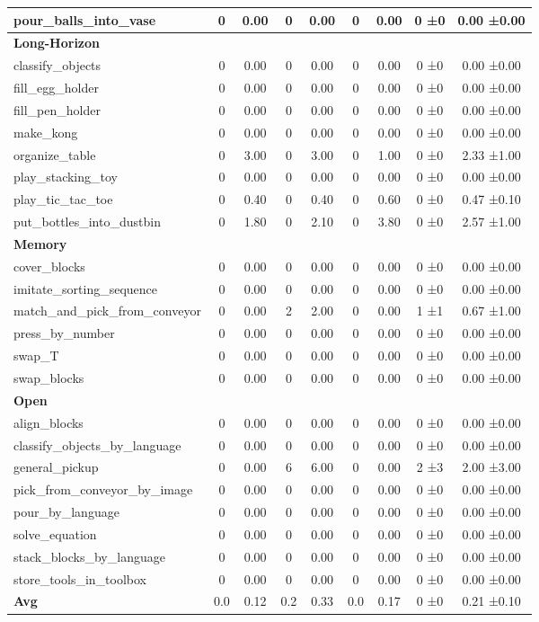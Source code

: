 \begin{table}[H]
{\begin{tabular}{l|c|c|c|c|c|c|c|c}
pour\_balls\_into\_vase & 0 & 0.00 & 0 & 0.00 & 0 & 0.00 & 0 ±0 & 0.00 ±0.00 \\
\hline
\multicolumn{9}{l}{\textbf{Long-Horizon}} \\
classify\_objects & 0 & 0.00 & 0 & 0.00 & 0 & 0.00 & 0 ±0 & 0.00 ±0.00 \\
fill\_egg\_holder & 0 & 0.00 & 0 & 0.00 & 0 & 0.00 & 0 ±0 & 0.00 ±0.00 \\
fill\_pen\_holder & 0 & 0.00 & 0 & 0.00 & 0 & 0.00 & 0 ±0 & 0.00 ±0.00 \\
make\_kong & 0 & 0.00 & 0 & 0.00 & 0 & 0.00 & 0 ±0 & 0.00 ±0.00 \\
organize\_table & 0 & 3.00 & 0 & 3.00 & 0 & 1.00 & 0 ±0 & 2.33 ±1.00 \\
play\_stacking\_toy & 0 & 0.00 & 0 & 0.00 & 0 & 0.00 & 0 ±0 & 0.00 ±0.00 \\
play\_tic\_tac\_toe & 0 & 0.40 & 0 & 0.40 & 0 & 0.60 & 0 ±0 & 0.47 ±0.10 \\
put\_bottles\_into\_dustbin & 0 & 1.80 & 0 & 2.10 & 0 & 3.80 & 0 ±0 & 2.57 ±1.00 \\
\hline
\multicolumn{9}{l}{\textbf{Memory}} \\
cover\_blocks & 0 & 0.00 & 0 & 0.00 & 0 & 0.00 & 0 ±0 & 0.00 ±0.00 \\
imitate\_sorting\_sequence & 0 & 0.00 & 0 & 0.00 & 0 & 0.00 & 0 ±0 & 0.00 ±0.00 \\
match\_and\_pick\_from\_conveyor & 0 & 0.00 & 2 & 2.00 & 0 & 0.00 & 1 ±1 & 0.67 ±1.00 \\
press\_by\_number & 0 & 0.00 & 0 & 0.00 & 0 & 0.00 & 0 ±0 & 0.00 ±0.00 \\
swap\_T & 0 & 0.00 & 0 & 0.00 & 0 & 0.00 & 0 ±0 & 0.00 ±0.00 \\
swap\_blocks & 0 & 0.00 & 0 & 0.00 & 0 & 0.00 & 0 ±0 & 0.00 ±0.00 \\
\hline
\multicolumn{9}{l}{\textbf{Open}} \\
align\_blocks & 0 & 0.00 & 0 & 0.00 & 0 & 0.00 & 0 ±0 & 0.00 ±0.00 \\
classify\_objects\_by\_language & 0 & 0.00 & 0 & 0.00 & 0 & 0.00 & 0 ±0 & 0.00 ±0.00 \\
general\_pickup & 0 & 0.00 & 6 & 6.00 & 0 & 0.00 & 2 ±3 & 2.00 ±3.00 \\
pick\_from\_conveyor\_by\_image & 0 & 0.00 & 0 & 0.00 & 0 & 0.00 & 0 ±0 & 0.00 ±0.00 \\
pour\_by\_language & 0 & 0.00 & 0 & 0.00 & 0 & 0.00 & 0 ±0 & 0.00 ±0.00 \\
solve\_equation & 0 & 0.00 & 0 & 0.00 & 0 & 0.00 & 0 ±0 & 0.00 ±0.00 \\
stack\_blocks\_by\_language & 0 & 0.00 & 0 & 0.00 & 0 & 0.00 & 0 ±0 & 0.00 ±0.00 \\
store\_tools\_in\_toolbox & 0 & 0.00 & 0 & 0.00 & 0 & 0.00 & 0 ±0 & 0.00 ±0.00 \\
\hline
\textbf{Avg} & 0.0 & 0.12 & 0.2 & 0.33 & 0.0 & 0.17 & 0 ±0 & 0.21 ±0.10 \\
\hline
\end{tabular}
}
\end{table}
